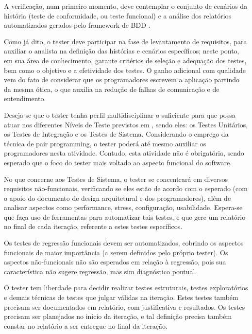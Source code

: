 \documentclass[12pt,journal,compsoc]{IEEEtran}
\begin{document}
A verificação, num primeiro momento, deve contemplar o conjunto de cenários da
história (teste de conformidade, ou teste funcional) e a análise dos relatórios
automatizados gerados pelo framework de BDD \cite{chelimsky2010rspec}.

Como já dito, o tester deve participar na fase de levantamento de requisitos, para auxiliar o analista na definição das histórias e cenários específicos; neste ponto, em sua área de conhecimento, garante critérios de seleção e adequação dos testes, bem como o objetivo e a efetividade dos testes. O ganho adicional com qualidade vem do fato de considerar que os programadores escrevem a aplicação partindo da mesma ótica, o que auxilia na redução de falhas de comunicação e de entendimento.

Deseja-se que o tester tenha perfil multidisciplinar o suficiente para que
possa atuar nos diferentes Níveis de Teste previstos em
\cite{society_software_2004}, sendo eles: os Testes Unitários, os Testes de
Integração e os Testes de Sistema. Considerando o emprego da técnica de pair
programming, o tester poderá até mesmo auxiliar os programadores nesta
atividade.  Contudo, esta atividade não é obrigatória, sendo esperado que o
foco do tester mais voltado ao aspecto funcional do software. 

No que concerne aos Testes de Sistema, o tester se concentrará em diversos
requisitos não-funcionais, verificando se eles estão de acordo com o esperado
(com o apoio do documento de design arquitetural e dos programadores), além de
analisar aspectos como performance, stress, configuração, usabilidade.
Espera-se que faça uso de  ferramentas para automatizar tais testes, e que gere
um relatório no final de cada iteração, referente a estes testes específicos.

Os testes de regressão funcionais devem ser automatizados, cobrindo os aspectos funcionais de maior importância (a serem definidos pelo próprio tester). Os aspectos não-funcionais não são esperados em relação à regressão, pois sua característica não sugere regressão, mas sim diagnóstico pontual.

O tester tem liberdade para decidir realizar testes estruturais, testes exploratórios e demais técnicas de testes que julgar válidas na iteração. Estes testes também precisam ser documentados em relatório, com justificativa e resultados. Os testes precisam ser planejados no início da iteração, e tal definição precisa também constar no relatório a ser entregue no final da iteração.
\end{document}
